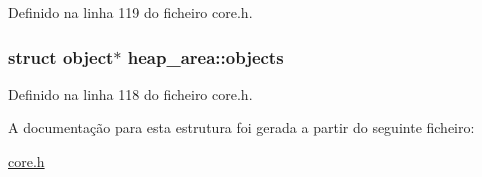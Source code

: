 Definido na linha 119 do ficheiro core.\-h.

\hypertarget{structheap__area_a65ca4dc228035e942540602c47146d29}{
\subsubsection[{objects}]{\setlength{\rightskip}{0pt plus 5cm}struct {\bf object}$\ast$ heap\-\_\-area\-::objects}}\label{structheap__area_a65ca4dc228035e942540602c47146d29}


Definido na linha 118 do ficheiro core.\-h.



A documentação para esta estrutura foi gerada a partir do seguinte ficheiro\-:\begin{DoxyCompactItemize}
\item 
\hyperlink{core_8h}{core.\-h}\end{DoxyCompactItemize}
